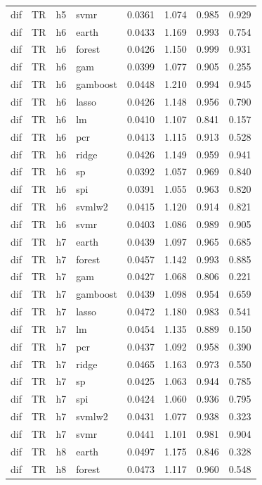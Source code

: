 \begin{ThreePartTable}
\begin{longtable}[t]{llclcccc}
dif & TR & h5 & svmr & 0.0361 & 1.074 & 0.985 & 0.929\\
\addlinespace
dif & TR & h6 & earth & 0.0433 & 1.169 & 0.993 & 0.754\\
dif & TR & h6 & forest & 0.0426 & 1.150 & 0.999 & 0.931\\
dif & TR & h6 & gam & 0.0399 & 1.077 & 0.905 & 0.255\\
dif & TR & h6 & gamboost & 0.0448 & 1.210 & 0.994 & 0.945\\
dif & TR & h6 & lasso & 0.0426 & 1.148 & 0.956 & 0.790\\
dif & TR & h6 & lm & 0.0410 & 1.107 & 0.841 & 0.157\\
dif & TR & h6 & pcr & 0.0413 & 1.115 & 0.913 & 0.528\\
dif & TR & h6 & ridge & 0.0426 & 1.149 & 0.959 & 0.941\\
dif & TR & h6 & sp & 0.0392 & 1.057 & 0.969 & 0.840\\
dif & TR & h6 & spi & 0.0391 & 1.055 & 0.963 & 0.820\\
dif & TR & h6 & svmlw2 & 0.0415 & 1.120 & 0.914 & 0.821\\
dif & TR & h6 & svmr & 0.0403 & 1.086 & 0.989 & 0.905\\
\addlinespace
dif & TR & h7 & earth & 0.0439 & 1.097 & 0.965 & 0.685\\
dif & TR & h7 & forest & 0.0457 & 1.142 & 0.993 & 0.885\\
dif & TR & h7 & gam & 0.0427 & 1.068 & 0.806 & 0.221\\
dif & TR & h7 & gamboost & 0.0439 & 1.098 & 0.954 & 0.659\\
dif & TR & h7 & lasso & 0.0472 & 1.180 & 0.983 & 0.541\\
dif & TR & h7 & lm & 0.0454 & 1.135 & 0.889 & 0.150\\
dif & TR & h7 & pcr & 0.0437 & 1.092 & 0.958 & 0.390\\
dif & TR & h7 & ridge & 0.0465 & 1.163 & 0.973 & 0.550\\
dif & TR & h7 & sp & 0.0425 & 1.063 & 0.944 & 0.785\\
dif & TR & h7 & spi & 0.0424 & 1.060 & 0.936 & 0.795\\
dif & TR & h7 & svmlw2 & 0.0431 & 1.077 & 0.938 & 0.323\\
dif & TR & h7 & svmr & 0.0441 & 1.101 & 0.981 & 0.904\\
\addlinespace
dif & TR & h8 & earth & 0.0497 & 1.175 & 0.846 & 0.328\\
dif & TR & h8 & forest & 0.0473 & 1.117 & 0.960 & 0.548\\

\end{longtable}
\end{ThreePartTable}
